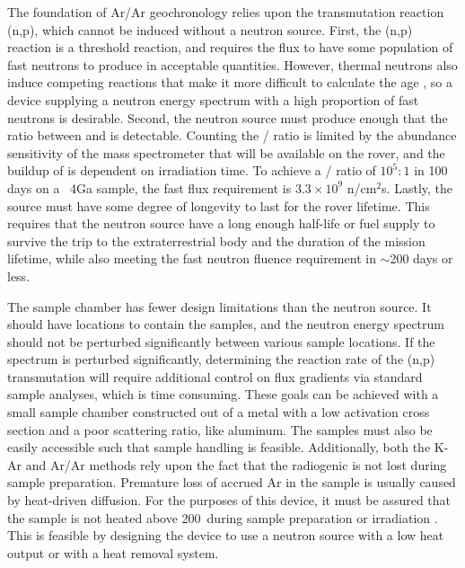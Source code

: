 \documentclass{mc2015}
\begin{document}
The foundation of Ar/Ar geochronology relies upon the transmutation reaction (n,p), which cannot be induced without a neutron source. First, the (n,p) reaction is a threshold reaction, and requires the flux to have some population of fast neutrons to produce  in acceptable quantities. However, thermal neutrons also induce competing reactions that make it more difficult to calculate the age \cite{mcdougall_geochronology_1999}, so a device supplying a neutron energy spectrum with a high proportion of fast neutrons is desirable. Second, the neutron source must produce enough  that the ratio between  and  is detectable. Counting the / ratio is limited by the abundance sensitivity of the mass spectrometer that will be available on the rover, and the buildup of  is dependent on irradiation time. To achieve a / ratio of $10^{5}:1$ in 100 days on a ~4Ga sample, the fast flux requirement is $3.3\times10^9$ n/cm$^2$s. Lastly, the source must have some degree of longevity to last for the rover lifetime. This requires that the neutron source have a long enough half-life or fuel supply to survive the trip to the extraterrestrial body and the duration of the mission lifetime, while also meeting the fast neutron fluence requirement in $\sim$200 days or less.   

The sample chamber has fewer design limitations than the neutron source. It should have locations to contain the samples, and the neutron energy spectrum should not be perturbed significantly between various sample locations. If the spectrum is perturbed significantly, determining the reaction rate of the (n,p) transmutation will require additional control on flux gradients via standard sample analyses, which is time consuming. These goals can be achieved with a small sample chamber constructed out of a metal with a low activation cross section and a poor scattering ratio, like aluminum. The samples must also be easily accessible such that sample handling is feasible. Additionally, both the K-Ar and Ar/Ar methods rely upon the fact that the radiogenic  is not lost during sample preparation. Premature loss of accrued Ar in the sample is usually caused by heat-driven diffusion. For the purposes of this device, it must be assured that the sample is not heated above 200\celsius\ during sample preparation or irradiation \cite{mcdougall_geochronology_1999}. This is feasible by designing the device to use a neutron source with a low heat output or with a heat removal system.
\end{document}
